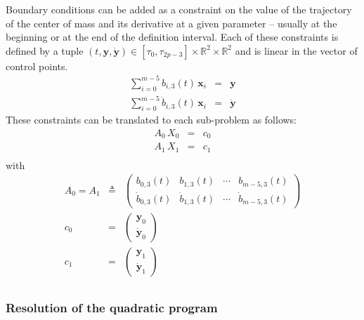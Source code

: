 \documentclass {article}
\newcommand\real{\mathbb{R}}
\newcommand\x{\mathbf{x}}
\newcommand\y{\mathbf{y}}
\newcommand\dy{\dot{\mathbf{y}}}
\begin{document}
Boundary conditions can be added as a constraint on the value of the
trajectory of the center of mass and its derivative at a given
parameter -- usually at the beginning or at the end of the definition
interval. Each of these constraints is defined by a tuple
$(t,\y,\dy)\in[\tau_0,\tau_{2p-3}]\times\real^2\times\real^2$ and is
  linear in the vector of control points.
\begin{eqnarray}\label{eq:constraint}
\sum_{i=0}^{m-5}b_{i,3}(t)\,\x_i &=&\y \\
\sum_{i=0}^{m-5}\dot{b}_{i,3}(t)\,\x_i &=& \dy
\end{eqnarray}
These constraints can be translated to each sub-problem as follows:
\begin{eqnarray*}
  A_0\,X_0 &=& c_0 \\
  A_1\,X_1 &=& c_1 \\
\end{eqnarray*}
with
\begin{eqnarray*}
  A_0 = A_1 &\triangleq& \left(\begin{array}{cccc}b_{0,3}(t)&b_{1,3}(t)&\cdots&b_{m-5,3}(t)\\
    \dot{b}_{0,3}(t)&\dot{b}_{1,3}(t)&\cdots&\dot{b}_{m-5,3}(t)\end{array}\right) \\
  c_0 &=& \left(\begin{array}{c}\y_0\\\dy_0\end{array}\right) \\
  c_1 &=& \left(\begin{array}{c}\y_1\\\dy_1\end{array}\right) \\
\end{eqnarray*}

\subsubsection {Resolution of the quadratic program}
\end{document}
